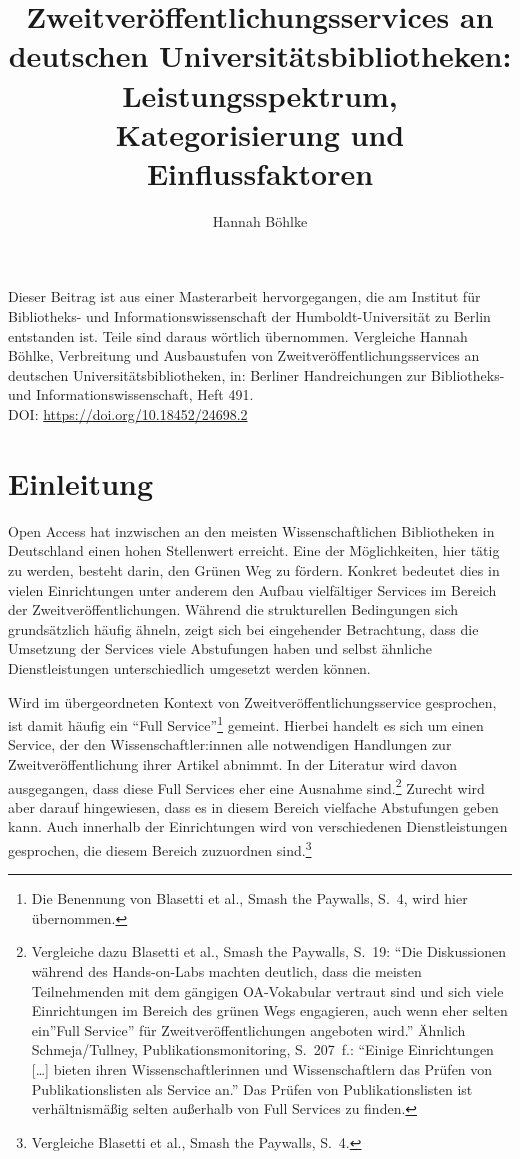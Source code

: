 \documentclass[a4paper,
fontsize=11pt,
oneside,
numbers=noperiodatend,
parskip=half-,
bibliography=totoc,
final
]{scrartcl}
\title{\LARGE{Zweitveröffentlichungsservices an deutschen Universitätsbibliotheken: Leistungsspektrum, Kategorisierung und Einflussfaktoren}}%
\author{Hannah Böhlke} %
\date{}
\begin{document}
\maketitle
\thispagestyle{fancyplain} 


Dieser Beitrag ist aus einer Masterarbeit hervorgegangen, die am
Institut für Bibliotheks- und Informationswissenschaft der
Humboldt-Universität zu Berlin entstanden ist. Teile sind daraus
wörtlich übernommen. Vergleiche Hannah Böhlke, Verbreitung und
Ausbaustufen von Zweitveröffentlichungsservices an deutschen
Universitätsbibliotheken, in: Berliner Handreichungen zur Bibliotheks-
und Informationswissenschaft, Heft 491.\\
DOI: \url{https://doi.org/10.18452/24698.2}

\hypertarget{einleitung}{%
\section{Einleitung}\label{einleitung}}

Open Access hat inzwischen an den meisten Wissenschaftlichen
Bibliotheken in Deutschland einen hohen Stellenwert erreicht. Eine der
Möglichkeiten, hier tätig zu werden, besteht darin, den Grünen Weg zu
fördern. Konkret bedeutet dies in vielen Einrichtungen unter anderem den
Aufbau vielfältiger Services im Bereich der Zweitveröffentlichungen.
Während die strukturellen Bedingungen sich grundsätzlich häufig ähneln,
zeigt sich bei eingehender Betrachtung, dass die Umsetzung der Services
viele Abstufungen haben und selbst ähnliche Dienstleistungen
unterschiedlich umgesetzt werden können.

Wird im übergeordneten Kontext von Zweitveröffentlichungsservice
gesprochen, ist damit häufig ein \enquote{Full Service}\footnote{Die
  Benennung von Blasetti et al., Smash the Paywalls, S.~4, wird hier
  übernommen.} gemeint. Hierbei handelt es sich um einen Service, der
den Wissenschaftler:innen alle notwendigen Handlungen zur
Zweitveröffentlichung ihrer Artikel abnimmt. In der Literatur wird davon
ausgegangen, dass diese Full Services eher eine Ausnahme
sind.\footnote{Vergleiche dazu Blasetti et al., Smash the Paywalls,
  S.~19: \enquote{Die Diskussionen während des Hands-on-Labs machten
  deutlich, dass die meisten Teilnehmenden mit dem gängigen OA-Vokabular
  vertraut sind und sich viele Einrichtungen im Bereich des grünen Wegs
  engagieren, auch wenn eher selten ein}Full Service'' für
  Zweitveröffentlichungen angeboten wird.'' Ähnlich Schmeja/Tullney,
  Publikationsmonitoring, S.~207~f.: \enquote{Einige Einrichtungen
  {[}\ldots{]} bieten ihren Wissenschaftlerinnen und Wissenschaftlern
  das Prüfen von Publikationslisten als Service an.} Das Prüfen von
  Publikationslisten ist verhältnismäßig selten außerhalb von Full
  Services zu finden.} Zurecht wird aber darauf hingewiesen, dass es in
diesem Bereich vielfache Abstufungen geben kann. Auch innerhalb der
Einrichtungen wird von verschiedenen Dienstleistungen gesprochen, die
diesem Bereich zuzuordnen sind.\footnote{Vergleiche Blasetti et al.,
  Smash the Paywalls, S.~4.}
\end{document}
